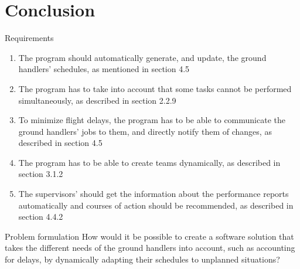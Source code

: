 \section{Conclusion}
\begin{frame}{Requirements}{}
\begin{enumerate}
\item The program should automatically generate, and update, the ground handlers’ schedules,
as mentioned in section 4.5
\item The program has to take into account that some tasks cannot be performed simultaneously,
as described in section 2.2.9
\item To minimize flight delays, the program has to be able to communicate the ground handlers’
jobs to them, and directly notify them of changes, as described in section 4.5
\item The program has to be able to create teams dynamically, as described in section 3.1.2
\item The supervisors’ should get the information about the performance reports automatically
and courses of action should be recommended, as described in section 4.4.2
\end{enumerate}
\end{frame}

\begin{frame}{Problem formulation}{}
	How would it be possible to create a
	software solution that takes the different needs of the ground handlers into account, such as
	accounting for delays, by dynamically adapting their schedules to unplanned situations?
\end{frame}